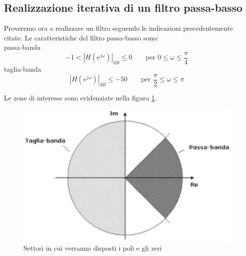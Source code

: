 \subsection{Realizzazione iterativa di un filtro passa-basso}
Proveremo ora a realizzare un filtro seguendo le indicazioni precedentemente citate.
Le caratteristiche del filtro passa-basso sono:\\
passa-banda
\begin{displaymath}
-1<|H(e^{j\omega})|_{dB}\leq0 \qquad\textrm{per } 0\leq\omega\leq\frac{\pi}{4}
\end{displaymath}
taglia-banda
\begin{displaymath}
|H(e^{j\omega})|_{dB}\leq-50 \qquad\textrm{per } \frac{\pi}{2}\leq\omega\leq\pi
\end{displaymath}

Le zone di interesse sono evidenziate nella figura \ref{Prog-FiltroPB}.\\
\begin{figure}[hp]
  \centering
  \includegraphics[scale=0.5]{images/Prog-FiltroPB.eps}
  \caption{Settori in cui verranno disposti i poli e gli zeri}
  \label{Prog-FiltroPB}
\end{figure}
%

